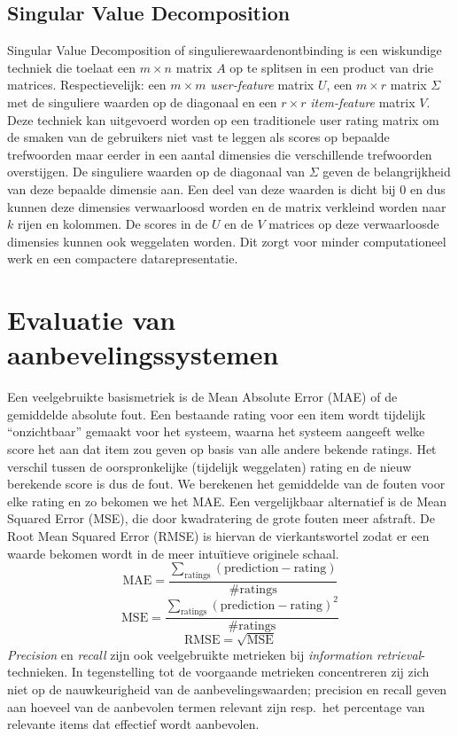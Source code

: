 \subsection{Singular Value Decomposition}
Singular Value Decomposition of singulierewaardenontbinding is een wiskundige techniek die toelaat een $m \times n$ matrix $A$ op te splitsen in een product van drie matrices. Respectievelijk: een $m \times m$ \emph{user-feature} matrix $U$, een $m \times r$ matrix $\Sigma$ met de singuliere waarden op de diagonaal en een $r \times r$ \emph{item-feature} matrix $V$.\\ 
Deze techniek kan uitgevoerd worden op een traditionele user rating matrix om de smaken van de gebruikers niet vast te leggen als scores op bepaalde trefwoorden maar eerder in een aantal dimensies die verschillende trefwoorden overstijgen. De singuliere waarden op de diagonaal van $\Sigma$ geven de belangrijkheid van deze bepaalde dimensie aan. Een deel van deze waarden is dicht bij 0 en dus kunnen deze  dimensies verwaarloosd worden en de matrix verkleind worden naar $k$ rijen en kolommen. De scores in de $U$ en de $V$ matrices op deze verwaarloosde dimensies kunnen ook weggelaten worden. Dit zorgt voor minder computationeel werk en een compactere datarepresentatie. 
\section{Evaluatie van aanbevelingssystemen}
Een veelgebruikte basismetriek is de Mean Absolute Error (MAE) of de gemiddelde absolute fout. Een bestaande rating voor een item wordt tijdelijk ``onzichtbaar'' gemaakt voor het systeem, waarna het systeem aangeeft welke score het aan dat item zou geven op basis van alle andere bekende ratings. Het verschil tussen de oorspronkelijke (tijdelijk weggelaten) rating en de nieuw berekende score is dus de fout. We berekenen het gemiddelde van de fouten voor elke rating en zo bekomen we het MAE. Een vergelijkbaar alternatief is de Mean Squared Error (MSE), die door kwadratering de grote fouten meer afstraft. De Root Mean Squared Error (RMSE) is hiervan de vierkantswortel zodat er een waarde bekomen wordt in de meer intu\"itieve originele schaal.
\begin{equation}
\text{MAE} = \frac{\sum_{\text{ratings}} (\text{prediction} - \text{rating})}{\#\text{ratings}}
\end{equation}
\begin{equation}
\text{MSE} = \frac{\sum_{\text{ratings}} (\text{prediction} - \text{rating})^2}{\#\text{ratings}}
\end{equation}
\begin{equation}
\text{RMSE} = \sqrt{\text{MSE}}
\end{equation}
\textit{Precision} en \emph{recall} zijn ook veelgebruikte metrieken bij \emph{information retrieval}-technieken. In tegenstelling tot de voorgaande metrieken concentreren zij zich niet op de nauwkeurigheid van de aanbevelingswaarden; precision en recall geven aan hoeveel van de aanbevolen termen relevant zijn resp.~het percentage van relevante items dat effectief wordt aanbevolen.
